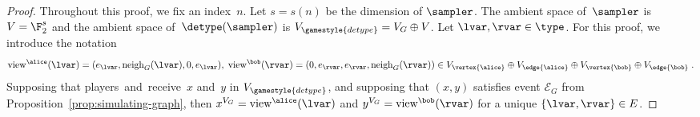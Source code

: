 \begin{proof}
  Throughout this proof, we fix an index~$n$.
  Let $s = s(n)$ be the dimension of $\sampler$.
  The ambient space of~$\sampler$ is $V = \F_2^s$ and the ambient space
  of~$\detype(\sampler)$ is $V_{\gamestyle{detype}} = V_G \oplus V$.
  Let $\lvar, \rvar \in \type$.
  For this proof, we introduce the notation
  \begin{equation*}
    \mathrm{view}^\alice(\lvar) =
    (e_\lvar, \mathrm{neigh}_G(\lvar), 0, e_\lvar),\;
    \mathrm{view}^\bob(\rvar) =
    (0, e_\rvar, e_\rvar, \mathrm{neigh}_G(\rvar))
    \in V_{\vertex{\alice}} \oplus V_{\edge{\alice}}
    \oplus V_{\vertex{\bob}} \oplus V_{\edge{\bob}}\;.
\end{equation*}
Supposing that players~\alice and~\bob receive~$x$ and~$y$ in
$V_{\gamestyle{detype}}$, and supposing that $(x, y)$ satisfies event
$\mathcal{E}_G$ from Proposition~\ref{prop:simulating-graph}, then $x^{V_G} =
\mathrm{view}^\alice(\lvar)$ and $y^{V_G} = \mathrm{view}^\bob(\rvar)$ for a unique
$\{\lvar, \rvar\} \in E$.


\end{proof}
